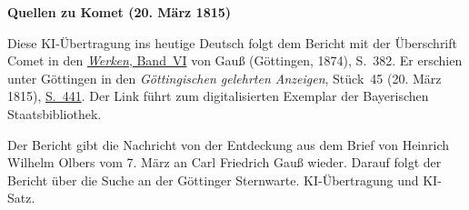 \clearpage\thispagestyle{empty}
\begin{center}\textbf{Quellen zu Komet (20. März 1815)}\end{center}
\noindent Diese KI-Übertragung ins heutige Deutsch folgt dem Bericht mit der Überschrift Comet in den \href{https://gdz.sub.uni-goettingen.de/id/PPN236007467}{\textit{Werken}, Band~VI} von Gauß (Göttingen, 1874), S.~382. Er erschien unter Göttingen in den \textit{Göttingischen gelehrten Anzeigen}, Stück~45 (20. März 1815), \href{https://api.digitale-sammlungen.de/iiif/image/v2/bsb10538686_00449/full/1600,/0/default.jpg}{S.~441}. Der Link führt zum digitalisierten Exemplar der Bayerischen Staatsbibliothek.
\par\smallskip\noindent Der Bericht gibt die Nachricht von der Entdeckung aus dem Brief von Heinrich Wilhelm Olbers vom 7. März an Carl Friedrich Gauß wieder. Darauf folgt der Bericht über die Suche an der Göttinger Sternwarte. KI-Übertragung und KI-Satz.
\clearpage
